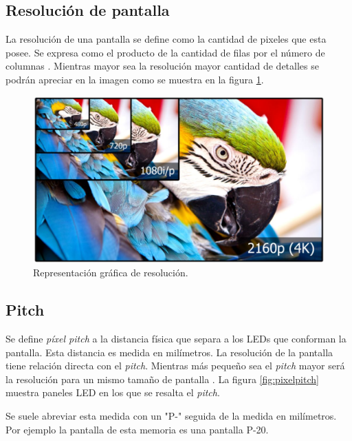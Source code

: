 \subsection{Resolución de pantalla}
La resolución de una pantalla se define como la cantidad de pixeles que esta posee. Se expresa como el producto de la cantidad de filas por el número de columnas \citep{WIKIRESOL}. Mientras mayor sea la resolución mayor cantidad de detalles se podrán apreciar en la imagen como se muestra en la figura \ref{fig:grafresolucion}.
\begin{figure}[htpb]
	\centering
	\includegraphics[scale=0.3]{Figures/resolucion.jpg} 
	\caption{Representación gráfica de resolución\protect\footnotemark.}
	\label{fig:grafresolucion}
\end{figure}

\subsection{Pitch}
Se define \textit{píxel pitch} a la distancia física que separa a los LEDs que conforman la pantalla. Esta distancia es medida en milímetros. La resolución de la pantalla tiene relación directa con el \textit{pitch}. Mientras más pequeño sea el \textit{pitch} mayor será la resolución para un mismo tamaño de pantalla \citep{IMAGENDEF2}. La figura \ref{fig:pixelpitch} muestra paneles LED en los que se resalta el \textit{pitch}.

Se suele abreviar esta medida con un "P-" seguida de la medida en milímetros. Por ejemplo la pantalla de esta memoria es una pantalla P-20.

